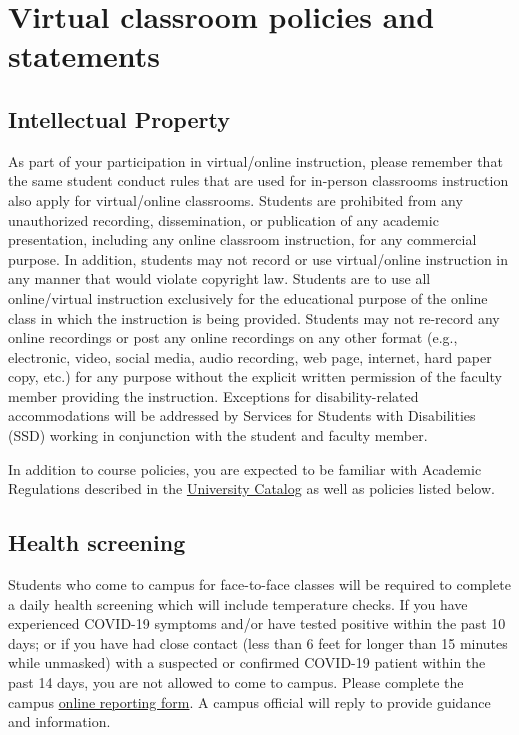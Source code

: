 \hypertarget{virtual-classroom-policies-and-statements}{%
\section{Virtual classroom policies and
statements}\label{virtual-classroom-policies-and-statements}}

\hypertarget{intellectual-property}{%
\subsection{Intellectual Property}\label{intellectual-property}}

As part of your participation in virtual/online instruction, please
remember that the same student conduct rules that are used for in-person
classrooms instruction also apply for virtual/online classrooms.
Students are prohibited from any unauthorized recording, dissemination,
or publication of any academic presentation, including any online
classroom instruction, for any commercial purpose. In addition, students
may not record or use virtual/online instruction in any manner that
would violate copyright law. Students are to use all online/virtual
instruction exclusively for the educational purpose of the online class
in which the instruction is being provided. Students may not re-record
any online recordings or post any online recordings on any other format
(e.g., electronic, video, social media, audio recording, web page,
internet, hard paper copy, etc.) for any purpose without the explicit
written permission of the faculty member providing the instruction.
Exceptions for disability-related accommodations will be addressed by
Services for Students with Disabilities (SSD) working in conjunction
with the student and faculty member.

In addition to course policies, you are expected to be familiar with
Academic Regulations described in the
\href{http://www.fresnostate.edu/catalog/academic-regulations/}{University
Catalog} as well as policies listed below.

\hypertarget{health-screening}{%
\subsection{Health screening}\label{health-screening}}

Students who come to campus for face-to-face classes will be required to
complete a daily health screening which will include temperature checks.
If you have experienced COVID-19 symptoms and/or have tested positive
within the past 10 days; or if you have had close contact (less than 6
feet for longer than 15 minutes while unmasked) with a suspected or
confirmed COVID-19 patient within the past 14 days, you are not allowed
to come to campus. Please complete the campus
\href{https://fresnostate.co1.qualtrics.com/jfe/form/SV_3faIAsuC8CzuFjD?Q_FormSessionID=FS_UFJ902LXgDJbKeZ}{online
reporting form}. A campus official will reply to provide guidance and
information.

